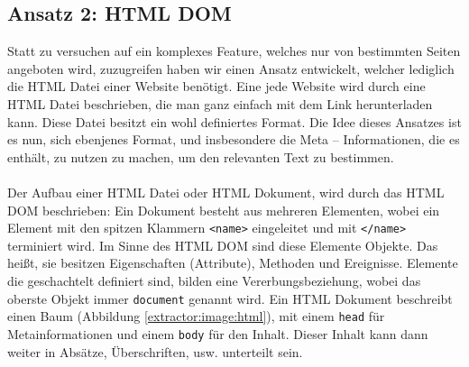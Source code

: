 \subsection[HTML DOM]{Ansatz 2: HTML DOM} %
\label{extractor:ansatz:subsec2}
Statt zu versuchen auf ein komplexes Feature, welches nur von bestimmten Seiten angeboten wird, zuzugreifen haben wir einen Ansatz entwickelt, welcher lediglich die HTML Datei einer Website benötigt. Eine jede Website wird durch eine HTML Datei beschrieben, die man ganz einfach mit dem Link herunterladen kann.
Diese Datei besitzt ein wohl definiertes Format. Die Idee dieses Ansatzes ist es nun, sich ebenjenes Format, und insbesondere die Meta – Informationen, die es enthält, zu nutzen zu machen, um den relevanten Text zu bestimmen. \\ \\ 
Der Aufbau einer HTML Datei oder HTML Dokument, wird durch das \ac{HTML DOM} beschrieben: Ein Dokument besteht aus mehreren Elementen, wobei ein Element mit den spitzen Klammern \texttt{<name>} eingeleitet und mit \texttt{</name>} terminiert wird. Im Sinne des \ac{HTML DOM} sind diese Elemente Objekte. Das heißt, sie besitzen Eigenschaften (Attribute), Methoden und Ereignisse. \cite{w3c_html} Elemente die geschachtelt definiert sind, bilden eine Vererbungsbeziehung, wobei das oberste Objekt immer \verb|document| genannt wird. Ein HTML Dokument beschreibt einen Baum (Abbildung \ref{extractor:image:html}), mit einem \verb|head| für Metainformationen und einem \verb|body| für den Inhalt. Dieser Inhalt kann dann weiter in Absätze, Überschriften, usw. unterteilt sein.  
